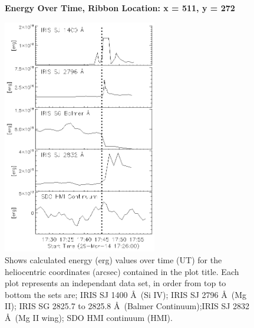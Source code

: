 \begin{figure}[H]
  \begin{center}
  \textbf{Energy Over Time, Ribbon Location: x = 511, y = 272 }\par\medskip
  \includegraphics[width=0.6\textwidth]{29-Mar-14-Ribbon-xyPosition-511-272-Frame-2-Energy-Ladder}
  \end{center}
  \caption{Shows calculated energy (erg) values over time (UT) for the heliocentric coordinates (arcsec) contained in the plot title. Each plot represents an independant data set, in order from top to bottom the sets are; IRIS SJ 1400 \AA\ (Si IV); IRIS SJ 2796 \AA\ (Mg II); IRIS SG  2825.7 to 2825.8 \AA\ (Balmer Continuum);IRIS SJ 2832 \AA\ (Mg II wing); SDO HMI continuum (HMI).}\label{erb20}
\end{figure}












